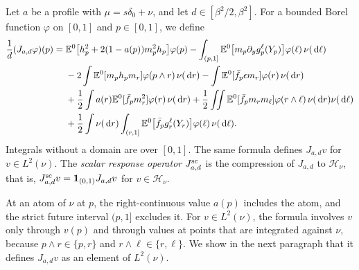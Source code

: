\begin{definition}\label{def:sc-response}
Let $a$ be a profile with $\mu=s\delta_0+\nu$, and let
$d\in[\beta^2/2,\beta^2]$. For a bounded Borel function $\varphi$ on
$[0,1]$ and $p\in[0,1]$, we define
\begin{align}
 \frac1d(J_{a,d}\varphi)(p)={}&
 \mathbb E^0\bigl[h_p^2+2(1-a(p))m_p^2h_p\bigr]\varphi(p)
 -\int_{(p,1]}\mathbb E^0\bigl[m_p\partial_y g_p^\ell(Y_p)\bigr]
                                      \varphi(\ell)\,\nu(\,\mathrm d\ell)\nonumber\\
 &-2\int\mathbb E^0[m_ph_pm_r]\varphi(p\wedge r)\,\nu(\,\mathrm d r)
  -\int\mathbb E^0[\bar f_p\epsilon m_r]\varphi(r)\,\nu(\,\mathrm d r)\nonumber\\
 &+\frac12\int a(r)\mathbb E^0[\bar f_pm_r^2]\varphi(r)\,\nu(\,\mathrm d r)
  +\frac12\iint\mathbb E^0[\bar f_pm_rm_\ell]\varphi(r\wedge\ell)
                                      \,\nu(\,\mathrm d r)\nu(\,\mathrm d\ell)\nonumber\\
 &+\frac12\int\nu(\,\mathrm d r)\int_{(r,1]}
           \mathbb E^0\bigl[\bar f_pg_r^\ell(Y_r)\bigr]\varphi(\ell)\,\nu(\,\mathrm d\ell).
 \label{eq:scalarJexplicit}
\end{align}
Integrals without a domain are over $[0,1]$. The same formula defines
$J_{a,d}v$ for $v\in L^2(\nu)$. The \emph{scalar response operator}
$J^{\mathrm{sc}}_{a,d}$ is the compression of $J_{a,d}$ to $\mathcal H_\nu$,
that is, $J^{\mathrm{sc}}_{a,d}v=\mathbf1_{(0,1)}J_{a,d}v$ for $v\in\mathcal H_\nu$.
\end{definition}

At an atom of $\nu$ at $p$, the right-continuous value $a(p)$ includes
the atom, and the strict future interval $(p,1]$ excludes it. For
$v\in L^2(\nu)$, the formula involves $v$ only through $v(p)$ and
through values at points that are integrated against $\nu$, because
$p\wedge r\in\{p,r\}$ and $r\wedge\ell\in\{r,\ell\}$. We show in the
next paragraph that it defines $J_{a,d}v$ as an element of $L^2(\nu)$.

